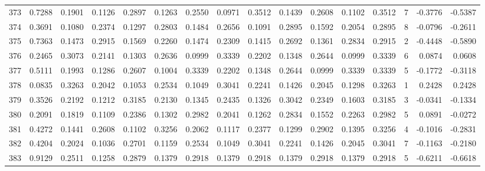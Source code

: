 \begin{tabular}{lrrrrrrrrrrrrrrr}
373 &      0.7288 &  0.1901 &  0.1126 &  0.2897 &  0.1263 &  0.2550 &  0.0971 &  0.3512 &  0.1439 &  0.2608 &   0.1102 &     0.3512 &      7 &                   -0.3776 &                    -0.5387 \\
374 &      0.3691 &  0.1080 &  0.2374 &  0.1297 &  0.2803 &  0.1484 &  0.2656 &  0.1091 &  0.2895 &  0.1592 &   0.2054 &     0.2895 &      8 &                   -0.0796 &                    -0.2611 \\
375 &      0.7363 &  0.1473 &  0.2915 &  0.1569 &  0.2260 &  0.1474 &  0.2309 &  0.1415 &  0.2692 &  0.1361 &   0.2834 &     0.2915 &      2 &                   -0.4448 &                    -0.5890 \\
376 &      0.2465 &  0.3073 &  0.2141 &  0.1303 &  0.2636 &  0.0999 &  0.3339 &  0.2202 &  0.1348 &  0.2644 &   0.0999 &     0.3339 &      6 &                    0.0874 &                     0.0608 \\
377 &      0.5111 &  0.1993 &  0.1286 &  0.2607 &  0.1004 &  0.3339 &  0.2202 &  0.1348 &  0.2644 &  0.0999 &   0.3339 &     0.3339 &      5 &                   -0.1772 &                    -0.3118 \\
378 &      0.0835 &  0.3263 &  0.2042 &  0.1053 &  0.2534 &  0.1049 &  0.3041 &  0.2241 &  0.1426 &  0.2045 &   0.1298 &     0.3263 &      1 &                    0.2428 &                     0.2428 \\
379 &      0.3526 &  0.2192 &  0.1212 &  0.3185 &  0.2130 &  0.1345 &  0.2435 &  0.1326 &  0.3042 &  0.2349 &   0.1603 &     0.3185 &      3 &                   -0.0341 &                    -0.1334 \\
380 &      0.2091 &  0.1819 &  0.1109 &  0.2386 &  0.1302 &  0.2982 &  0.2041 &  0.1262 &  0.2834 &  0.1552 &   0.2263 &     0.2982 &      5 &                    0.0891 &                    -0.0272 \\
381 &      0.4272 &  0.1441 &  0.2608 &  0.1102 &  0.3256 &  0.2062 &  0.1117 &  0.2377 &  0.1299 &  0.2902 &   0.1395 &     0.3256 &      4 &                   -0.1016 &                    -0.2831 \\
382 &      0.4204 &  0.2024 &  0.1036 &  0.2701 &  0.1159 &  0.2534 &  0.1049 &  0.3041 &  0.2241 &  0.1426 &   0.2045 &     0.3041 &      7 &                   -0.1163 &                    -0.2180 \\
383 &      0.9129 &  0.2511 &  0.1258 &  0.2879 &  0.1379 &  0.2918 &  0.1379 &  0.2918 &  0.1379 &  0.2918 &   0.1379 &     0.2918 &      5 &                   -0.6211 &                    -0.6618 \\

\end{tabular}
